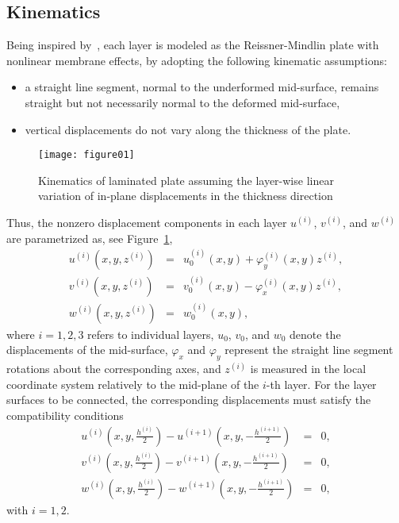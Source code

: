\documentclass[11pt]{article}
\newcommand{\dispx}{u} \newcommand{\dispy}{v} \newcommand{\dispz}{w}
\newcommand{\rotx}{\varphi_x} \newcommand{\roty}{\varphi_y}
\newcommand{\layer}[1]{^{(#1)}}
\newcommand{\lay}[1]{^{(#1)}}
\begin{document}
\subsection{Kinematics}\label{sec:kinematics}
Being inspired by~\cite{Pica:1980:FEA}, each layer is modeled as the Reissner-Mindlin plate with nonlinear membrane effects, by adopting
the following kinematic assumptions:
\begin{itemize}
\item a straight line segment, normal to the underformed mid-surface, remains
straight but not necessarily normal to the deformed mid-surface,
\item vertical displacements do not vary along the thickness of the plate.
\end{itemize}
\begin{figure}[ht]
\centerline{\texttt{[image: figure01]} 
}\caption{Kinematics of laminated plate assuming the layer-wise linear variation of in-plane displacements in the thickness direction}
\label{fig:lam_plate}
\end{figure}
Thus, the nonzero displacement components in each layer $\dispx\lay{i}$, $\dispy\lay{i}$, and $\dispz\lay{i}$
are parametrized as, see Figure~\ref{fig:lam_plate},
\begin{subequations}
\label{eq4:displac}
\begin{eqnarray}
u\layer{i}(x,y,z\layer{i}) &=& u_0\layer{i}(x,y) + \roty\layer{i}(x,y) z\layer{i}, \\
v\layer{i}(x,y,z\layer{i}) &=& v_0\layer{i}(x,y) - \rotx\layer{i}(x,y) z\layer{i}, \\
w\layer{i}(x,y,z\layer{i}) &=& w_0\layer{i}(x,y),
\end{eqnarray}
\end{subequations}
where $i=1,2,3$ refers to individual layers, $u_0$, $v_0$, and $w_0$ denote the
displacements of the mid-surface, $\rotx$ and $\roty$ represent the straight line segment
rotations about the corresponding axes, and $z\layer{i}$ is measured in
the local coordinate system relatively to the mid-plane of the $i$-th layer.
For the layer surfaces to be connected, the corresponding displacements must satisfy the
compatibility conditions
\begin{subequations}\label{eq4:continuityLEP}
\begin{eqnarray}
u\layer{i}(x,y,\frac{h\layer{i}}{2}) - u\layer{i+1}(x,y,-\frac{h\layer{i+1}}{2}) &=& 0,\\
v\layer{i}(x,y,\frac{h\layer{i}}{2}) - v\layer{i+1}(x,y,-\frac{h\layer{i+1}}{2}) &=& 0,\\
w\layer{i}(x,y,\frac{h\layer{i}}{2}) - w\layer{i+1}(x,y,-\frac{h\layer{i+1}}{2}) &=& 0,
\end{eqnarray}
\end{subequations}
with $i=1,2$.
\end{document}

